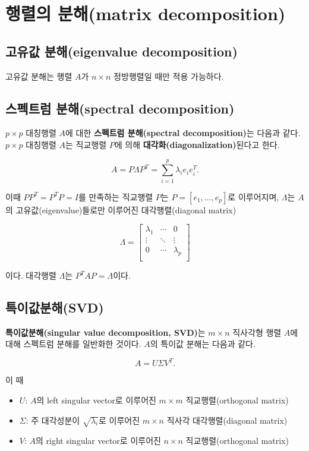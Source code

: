 \documentclass[b5paper,]{scrbook}
\theoremstyle{plain}
\theoremstyle{definition}
\numberwithin{equation}{section}
\begin{document}
\section{행렬의 분해(matrix decomposition)}\label{-matrix-decomposition}

\subsection{고유값 분해(eigenvalue
decomposition)}\label{-eigenvalue-decomposition}

고유값 분해는 행렬 \(A\)가 \(n\times n\) 정방행렬일 때만 적용 가능하다.

\subsection{스펙트럼 분해(spectral
decomposition)}\label{-spectral-decomposition}

\(p\times p\) 대칭행렬 \(A\)에 대한 \textbf{스펙트럼 분해(spectral
decomposition)}는 다음과 같다. \(p\times p\) 대칭행렬 \(A\)는 직교행렬
\(P\)에 의해 \textbf{대각화(diagonalization)}된다고 한다.

\[A=P\Lambda P^{T}=\sum_{i=1}^{p}\lambda_{i}e_{i}e_{i}^{T}.\]

이때 \(PP^{T}=P^{T}P=I\)를 만족하는 직교행렬 \(P\)는
\(P=[e_{1},\ldots , e_{p}]\)로 이루어지며, \(\Lambda\)는 \(A\)의
고유값(eigenvalue)들로만 이루어진 대각행렬(diagonal matrix)

\[
\Lambda=
\begin{bmatrix}
\lambda_{1} & \cdots & 0\\
\vdots & \ddots & \vdots\\
0 & \cdots & \lambda_{p}\\
\end{bmatrix}
\]

이다. 대각행렬 \(\Lambda\)는 \(P^{T}AP=\Lambda\)이다.

\subsection{특이값분해(SVD)}\label{svd}

\textbf{특이값분해(singular value decomposition, SVD)}는 \(m\times n\)
직사각형 행렬 \(A\)에 대해 스펙트럼 분해를 일반화한 것이다. \(A\)의
특이값 분해는 다음과 같다.

\[A=U\Sigma V^{T}.\]

이 때

\begin{itemize}
\item
  \(U\): \(A\)의 left singular vector로 이루어진 \(m\times m\)
  직교행렬(orthogonal matrix)
\item
  \(\Sigma\): 주 대각성분이 \(\sqrt{\lambda_{i}}\)로 이루어진
  \(m\times n\) 직사각 대각행렬(diagonal matrix)
\item
  \(V\): \(A\)의 right singular vector로 이루어진 \(n\times n\)
  직교행렬(orthogonal matrix)
\end{itemize}
\end{document}
